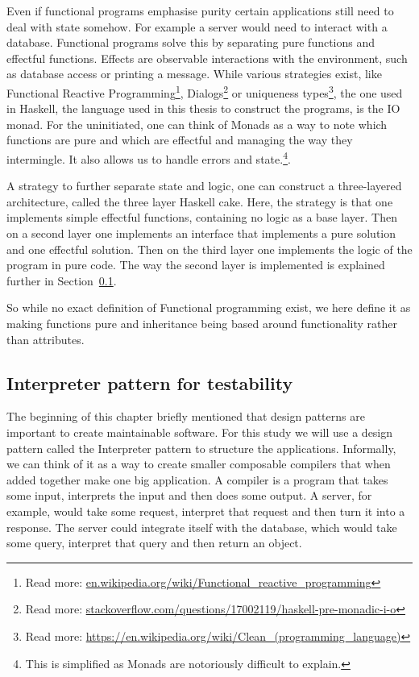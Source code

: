 \begin{description}
Even if functional programs emphasise purity certain applications still need to
        deal with state somehow. For example a server would need to interact
        with a database. Functional programs solve this by separating pure
        functions and effectful functions. Effects are observable interactions
        with the environment, such as database access or printing a message.
        While various strategies exist, like Functional Reactive
        Programming\footnote{Read more:
        \url{en.wikipedia.org/wiki/Functional_reactive_programming}},
        Dialogs\footnote{Read more:
        \url{stackoverflow.com/questions/17002119/haskell-pre-monadic-i-o}} or
        uniqueness types\footnote{Read more:
        \url{https://en.wikipedia.org/wiki/Clean_(programming_language)}}, the
        one used in Haskell, the language used in this thesis to construct the
        programs, is the IO monad. For the uninitiated, one can think of Monads
        as a way to note which functions are pure and which are effectful and
        managing the way they intermingle. It also allows us to handle errors
        and state.\footnote{This is simplified as Monads are notoriously
        difficult to explain.}. 

A strategy to further separate state and logic, one can construct a
        three-layered architecture, called the three layer Haskell cake. Here,
        the strategy is that one implements simple effectful functions,
        containing no logic as a base layer. Then on a second layer one
        implements an interface that implements a pure solution and one
        effectful solution. Then on the third layer one implements the logic of
        the program in pure code. The way the second layer is implemented is
        explained further in Section~\ref{interpreterpattern}. 
\end{description}

So while no exact definition of Functional programming exist, we here define it
as making functions pure and inheritance being based around functionality rather
than attributes.

\subsection{Interpreter pattern for testability}\label{interpreterpattern}

The beginning of this chapter briefly mentioned that design patterns are
important to create maintainable software.  For this study we will use a design
pattern called the Interpreter pattern to structure the applications.
Informally, we can think of it as a way to create smaller composable compilers
that when added together make one big application. A compiler is a program that
takes some input, interprets the input and then does some output. A server, for
example, would take some request, interpret that request and then turn it into
a response. The server could integrate itself with the database, which would
take some query, interpret that query and then return an
object.~\cite{interpreterpattern}

